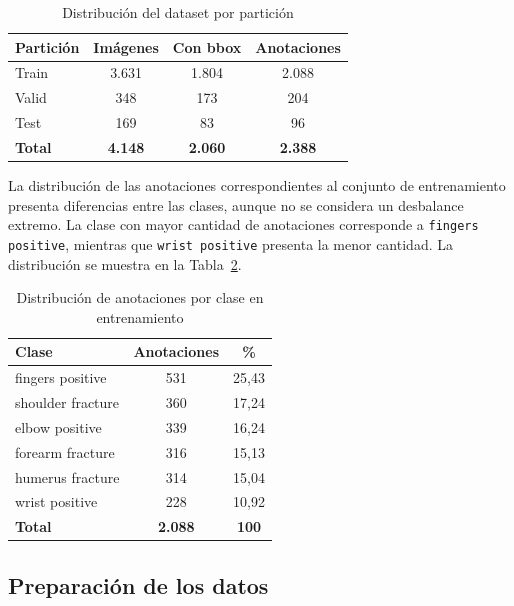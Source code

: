 \documentclass[conference]{IEEEtran}
\begin{document}
\begin{table}[htbp]
\caption{Distribución del dataset por partición}
\label{tab:dataset}
\begin{center}
\begin{tabular}{lccc}
\toprule
\textbf{Partición} & \textbf{Imágenes} & \textbf{Con bbox} & \textbf{Anotaciones} \\
\midrule
Train & 3.631 & 1.804 & 2.088 \\
Valid & 348 & 173 & 204 \\
Test  & 169 & 83 & 96 \\
\midrule
\textbf{Total} & \textbf{4.148} & \textbf{2.060} & \textbf{2.388} \\
\bottomrule
\end{tabular}
\end{center}
\end{table}

La distribución de las anotaciones correspondientes al conjunto de entrenamiento presenta diferencias entre las clases, aunque no se considera un desbalance extremo. La clase con mayor cantidad de anotaciones corresponde a \texttt{fingers positive}, mientras que \texttt{wrist positive} presenta la menor cantidad. La distribución se muestra en la Tabla~\ref{tab:clases}.

\begin{table}[htbp]
\caption{Distribución de anotaciones por clase en entrenamiento}
\label{tab:clases}
\begin{center}
\begin{tabular}{lcc}
\toprule
\textbf{Clase} & \textbf{Anotaciones} & \textbf{\%} \\
\midrule
fingers positive  & 531 & 25,43 \\
shoulder fracture & 360 & 17,24 \\
elbow positive    & 339 & 16,24 \\
forearm fracture  & 316 & 15,13 \\
humerus fracture  & 314 & 15,04 \\
wrist positive    & 228 & 10,92 \\
\midrule
\textbf{Total} & \textbf{2.088} & \textbf{100} \\
\bottomrule
\end{tabular}
\end{center}
\end{table}


\subsection{Preparación de los datos}
\end{document}

